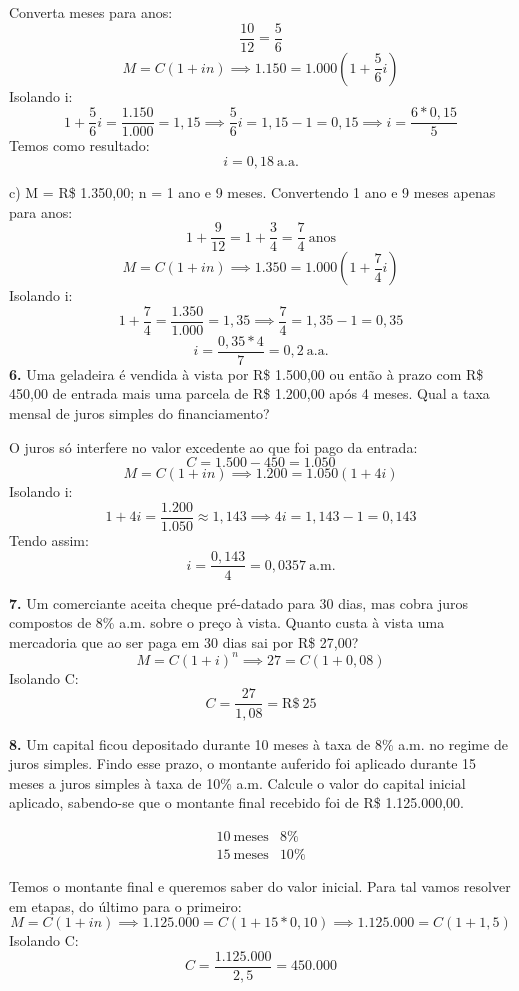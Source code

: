 \documentclass[12pt,a4paper]{article}
\begin{document}
  Converta meses para anos:
  \[
    \frac{10}{12} = \frac{5}{6}
  \]
  \[  
    M = C(1 + in) \implies 1.150 = 1.000\left( 1 + \frac{5}{6}i\right)
  \]
  Isolando i:
  \[
    1 + \frac{5}{6}i = \frac{1.150}{1.000} = 1,15 \implies \frac{5}{6}i =1,15 - 1 = 0,15 \implies i = \frac{6*0,15}{5}
  \]
  Temos como resultado:
  \[
    i = 0,18\ \text{a.a.}
  \]

  \hspace*{.5cm} c) M = R\$ 1.350,00; n = 1 ano e 9 meses.
  Convertendo 1 ano e 9 meses apenas para anos:
  \[
    1 + \frac{9}{12} = 1 + \frac{3}{4} = \frac{7}{4}\ \text{anos}
  \]
  \[
    M = C( 1 + in ) \implies 1.350 = 1.000\left( 1 + \frac{7}{4}i\right)
  \]
  Isolando i:
  \[
    1 + \frac{7}{4} = \frac{1.350}{1.000} = 1,35 \implies \frac{7}{4} = 1,35-1 = 0,35
  \]
  \[
    i = \frac{0,35*4}{7} = 0,2\ \text{a.a.}
  \]
  \newpage
  \textbf{6.} Uma geladeira é vendida à vista por R\$ 1.500,00 ou então à prazo com R\$ 450,00
  de entrada mais uma parcela de R\$ 1.200,00 após 4 meses. Qual a taxa mensal de juros
  simples do financiamento?
  \vspace*{.5cm}

  O juros só interfere no valor excedente ao que foi pago da entrada:
  \[
    C = 1.500 - 450 = 1.050
  \]
  \[
    M = C(1 + in) \implies 1.200 = 1.050 ( 1 + 4i)
  \]
  Isolando i:
  \[
    1 + 4i = \frac{1.200}{1.050} \approx 1,143 \implies 4i = 1,143 - 1 = 0,143
  \]
  Tendo assim:
  \[
    i = \frac{0,143}{4} = 0,0357\ \text{a.m.}
  \]

  \textbf{7.} Um comerciante aceita cheque pré-datado para 30 dias, mas cobra juros compostos
  de 8\% a.m. sobre o preço à vista. Quanto custa à vista uma mercadoria que ao ser paga
  em 30 dias sai por R\$ 27,00?
  \[
    M = C ( 1 + i)^n \implies 27 = C ( 1 + 0,08 )
  \]
  Isolando C:
  \[
    C = \frac{27}{1,08} = \text{R\$}\ 25
  \]

  \textbf{8.} Um capital ficou depositado durante 10 meses à taxa de 8\% a.m. no regime de
  juros simples. Findo esse prazo, o montante auferido foi aplicado durante 15 meses a juros
  simples à taxa de 10\% a.m. Calcule o valor do capital inicial aplicado, sabendo-se que o
  montante final recebido foi de R\$ 1.125.000,00.

  \[
    \begin{array}{lr}
      10\ \text{meses} & 8\% \\
      15\ \text{meses} & 10\% 
    \end{array}
  \]

  Temos o montante final e queremos saber do valor inicial. Para tal vamos resolver em etapas,
  do último para o primeiro:
  \[
    M = C ( 1 + in ) \implies 1.125.000 = C ( 1 + 15*0,10) \implies 1.125.000 = C ( 1 + 1,5 )
  \]
  Isolando C:
  \[ 
    C = \frac{1.125.000}{2,5} = 450.000
  \]
\end{document}

